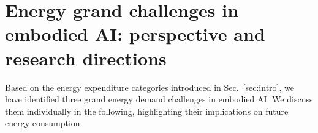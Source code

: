 \section{Energy grand challenges in embodied AI: perspective and research directions}\label{sec:energy_grand_challenges}
Based on the energy expenditure categories introduced in Sec.~\ref{sec:intro}, we have identified three grand energy demand challenges in embodied AI. We discuss them individually in the following, highlighting their implications on future energy consumption.


